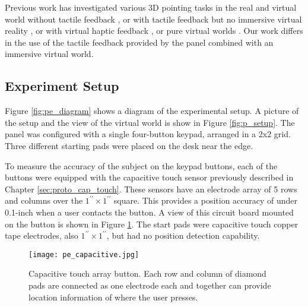 Previous work has investigated various 3D pointing tasks in the real and virtual world without tactile feedback \citep{liu_comparing_2009}, or with tactile feedback but no immersive virtual reality \citep{teather_evaluating_2010}, or with virtual haptic feedback \citep{chun_evaluating_2004}, or pure virtual worlds \citep{bruder_touch_2013,grossman_pointing_2004}.
Our work differs in the use of the tactile feedback provided by the panel combined with an immersive virtual world.

\subsection{Experiment Setup}

Figure \ref{fig:pe_diagram} shows a diagram of the experimental setup.
A picture of the setup and the view of the virtual world is show in Figure \ref{fig:p_setup}.
The panel was configured with a single four-button keypad, arranged in a 2x2 grid.
Three different starting pads were placed on the desk near the edge.

To measure the accuracy of the subject on the keypad buttons, each of the buttons were equipped with the capacitive touch sensor previously described in Chapter \ref{sec:proto_cap_touch}.
These sensors have an electrode array of 5 rows and columns over the $1^{\prime\prime} \times 1^{\prime\prime}$ square.
This provides a position accuracy of under 0.1-inch when a user contacts the button.
A view of this circuit board mounted on the button is shown in Figure \ref{fig:pe_capacitive}.
The start pads were capacitive touch copper tape electrodes, also $1^{\prime\prime} \times 1^{\prime\prime}$, but had no position detection capability.

\begin{figure}
    \centering
    \texttt{[image: pe\_capacitive.jpg]}
    \caption{Capacitive touch array button. Each row and column of diamond pads are connected as one electrode each and together can provide location information of where the user presses.}
    \label{fig:pe_capacitive}
\end{figure}

